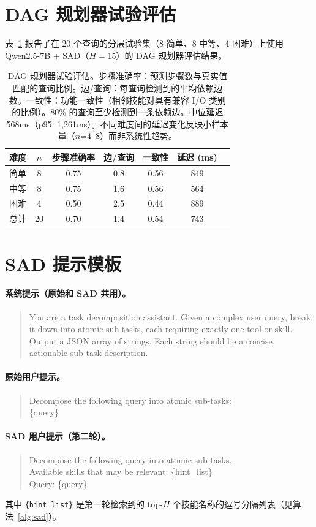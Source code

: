 \documentclass[11pt,a4paper]{ctexart}
\begin{document}
\section{DAG 规划器试验评估}
\label{app:dag-pilot}

表~\ref{tab:dag-pilot} 报告了在 20 个查询的分层试验集（8 简单、8 中等、4 困难）上使用 Qwen2.5-7B + SAD（$H{=}15$）的 DAG 规划器评估结果。

\begin{table}[h]
\centering
\small
\begin{tabular}{lcccccc}
\toprule
\textbf{难度} & \textbf{$n$} & \textbf{步骤准确率} & \textbf{边/查询} & \textbf{一致性} & \textbf{延迟 (ms)} \\
\midrule
简单 & 8 & 0.75 & 0.8 & 0.56 & 849 \\
中等 & 8 & 0.75 & 1.6 & 0.56 & 564 \\
困难 & 4 & 0.50 & 2.5 & 0.44 & 889 \\
\midrule
总计 & 20 & 0.70 & 1.4 & 0.54 & 743 \\
\bottomrule
\end{tabular}
\caption{DAG 规划器试验评估。步骤准确率：预测步骤数与真实值匹配的查询比例。边/查询：每查询检测到的平均依赖边数。一致性：功能一致性（相邻技能对具有兼容 I/O 类别的比例）。80\% 的查询至少检测到一条依赖边。中位延迟 568ms（p95: 1,261ms）。不同难度间的延迟变化反映小样本量（$n$=4--8）而非系统性趋势。}
\label{tab:dag-pilot}
\end{table}

\section{SAD 提示模板}
\label{app:sad-prompts}

\paragraph{系统提示（原始和 SAD 共用）。}
\begin{quote}
\small\ttfamily
You are a task decomposition assistant. Given a complex user query, break it down into atomic sub-tasks, each requiring exactly one tool or skill. Output a JSON array of strings. Each string should be a concise, actionable sub-task description.
\end{quote}

\paragraph{原始用户提示。}
\begin{quote}
\small\ttfamily
Decompose the following query into atomic sub-tasks:\\ \{query\}
\end{quote}

\paragraph{SAD 用户提示（第二轮）。}
\begin{quote}
\small\ttfamily
Decompose the following query into atomic sub-tasks.\\ Available skills that may be relevant: \{hint\_list\}\\ Query: \{query\}
\end{quote}

\noindent 其中 \texttt{\{hint\_list\}} 是第一轮检索到的 top-$H$ 个技能名称的逗号分隔列表（见算法~\ref{alg:sad}）。
\end{document}
